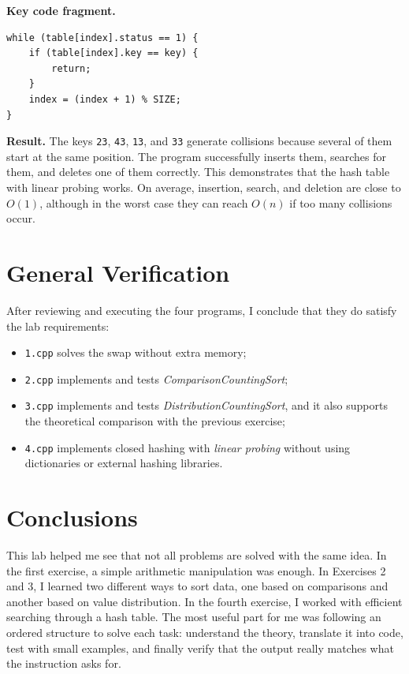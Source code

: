 \documentclass[12pt,a4paper]{article}
\begin{document}
\textbf{Key code fragment.}
\begin{lstlisting}
while (table[index].status == 1) {
    if (table[index].key == key) {
        return;
    }
    index = (index + 1) % SIZE;
}
\end{lstlisting}

\textbf{Result.} The keys \texttt{23}, \texttt{43}, \texttt{13}, and \texttt{33} generate collisions because several of them start at the same position. The program successfully inserts them, searches for them, and deletes one of them correctly. This demonstrates that the hash table with linear probing works. On average, insertion, search, and deletion are close to \(O(1)\), although in the worst case they can reach \(O(n)\) if too many collisions occur.

\section*{General Verification}
After reviewing and executing the four programs, I conclude that they do satisfy the lab requirements:

\begin{itemize}
\item \texttt{1.cpp} solves the swap without extra memory;
\item \texttt{2.cpp} implements and tests \textit{ComparisonCountingSort};
\item \texttt{3.cpp} implements and tests \textit{DistributionCountingSort}, and it also supports the theoretical comparison with the previous exercise;
\item \texttt{4.cpp} implements closed hashing with \textit{linear probing} without using dictionaries or external hashing libraries.
\end{itemize}

\section*{Conclusions}
This lab helped me see that not all problems are solved with the same idea. In the first exercise, a simple arithmetic manipulation was enough. In Exercises 2 and 3, I learned two different ways to sort data, one based on comparisons and another based on value distribution. In the fourth exercise, I worked with efficient searching through a hash table. The most useful part for me was following an ordered structure to solve each task: understand the theory, translate it into code, test with small examples, and finally verify that the output really matches what the instruction asks for.
\end{document}
